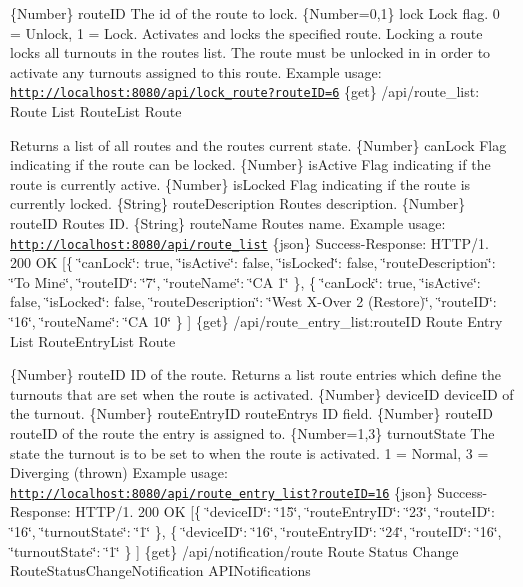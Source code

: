 \{Number\} route\+ID The id of the route to lock.  \{Number=0,1\} lock Lock flag. 0 = Unlock, 1 = Lock.  Activates and locks the specified route. Locking a route locks all turnouts in the route\textquotesingle{}s list. The route must be unlocked in in order to activate any turnouts assigned to this route.  Example usage\+: \href{http://localhost:8080/api/lock_route?routeID=6}{\tt http\+://localhost\+:8080/api/lock\+\_\+route?route\+I\+D=6}  \{get\} /api/route\+\_\+list\+: Route List  Route\+List  Route

Returns a list of all routes and the routes current state.  \{Number\} can\+Lock Flag indicating if the route can be locked.  \{Number\} is\+Active Flag indicating if the route is currently active.  \{Number\} is\+Locked Flag indicating if the route is currently locked.  \{String\} route\+Description Route\textquotesingle{}s description.  \{Number\} route\+ID Route\textquotesingle{}s ID.  \{String\} route\+Name Route\textquotesingle{}s name.  Example usage\+: \href{http://localhost:8080/api/route_list}{\tt http\+://localhost\+:8080/api/route\+\_\+list}  \{json\} Success-\/\+Response\+: H\+T\+T\+P/1. 200 OK \mbox{[}\{ \char`\"{}can\+Lock\char`\"{}\+: true, \char`\"{}is\+Active\char`\"{}\+: false, \char`\"{}is\+Locked\char`\"{}\+: false, \char`\"{}route\+Description\char`\"{}\+: \char`\"{}\+To Mine\char`\"{}, \char`\"{}route\+I\+D\char`\"{}\+: \char`\"{}7\char`\"{}, \char`\"{}route\+Name\char`\"{}\+: \char`\"{}\+C\+A 1\char`\"{} \}, \{ \char`\"{}can\+Lock\char`\"{}\+: true, \char`\"{}is\+Active\char`\"{}\+: false, \char`\"{}is\+Locked\char`\"{}\+: false, \char`\"{}route\+Description\char`\"{}\+: \char`\"{}\+West X-\/\+Over 2 (\+Restore)\char`\"{}, \char`\"{}route\+I\+D\char`\"{}\+: \char`\"{}16\char`\"{}, \char`\"{}route\+Name\char`\"{}\+: \char`\"{}\+C\+A 10\char`\"{} \} \mbox{]}  \{get\} /api/route\+\_\+entry\+\_\+list\+:route\+ID Route Entry List  Route\+Entry\+List  Route

\{Number\} route\+ID ID of the route.  Returns a list route entries which define the turnouts that are set when the route is activated.  \{Number\} device\+ID device\+ID of the turnout.  \{Number\} route\+Entry\+ID route\+Entry\textquotesingle{}s ID field.  \{Number\} route\+ID route\+ID of the route the entry is assigned to.  \{Number=1,3\} turnout\+State The state the turnout is to be set to when the route is activated. 1 = Normal, 3 = Diverging (thrown)  Example usage\+: \href{http://localhost:8080/api/route_entry_list?routeID=16}{\tt http\+://localhost\+:8080/api/route\+\_\+entry\+\_\+list?route\+I\+D=16}  \{json\} Success-\/\+Response\+: H\+T\+T\+P/1. 200 OK \mbox{[}\{ \char`\"{}device\+I\+D\char`\"{}\+: \char`\"{}15\char`\"{}, \char`\"{}route\+Entry\+I\+D\char`\"{}\+: \char`\"{}23\char`\"{}, \char`\"{}route\+I\+D\char`\"{}\+: \char`\"{}16\char`\"{}, \char`\"{}turnout\+State\char`\"{}\+: \char`\"{}1\char`\"{} \}, \{ \char`\"{}device\+I\+D\char`\"{}\+: \char`\"{}16\char`\"{}, \char`\"{}route\+Entry\+I\+D\char`\"{}\+: \char`\"{}24\char`\"{}, \char`\"{}route\+I\+D\char`\"{}\+: \char`\"{}16\char`\"{}, \char`\"{}turnout\+State\char`\"{}\+: \char`\"{}1\char`\"{} \} \mbox{]}  \{get\} /api/notification/route Route Status Change  Route\+Status\+Change\+Notification  A\+P\+I\+Notifications

